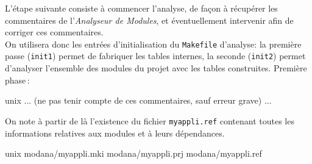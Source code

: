L'\'{e}tape suivante consiste \`{a} commencer l'analyse, de fa\c{c}on \`{a}
r\'{e}cup\'{e}rer les commentaires de l'{\em Analyseur de Modules}, et
\'{e}ventuellement intervenir afin de corriger ces commentaires.\\
On utilisera donc les entr\'{e}es d'initialisation du {\tt Makefile} d'analyse:
la premi\`{e}re passe ({\tt init1}) permet de fabriquer les tables
internes, la seconde 
({\tt init2}) permet d'analyser l'ensemble des modules du projet avec
les tables construites. Premi\`{e}re phase\,:
\begin{Longcode*}
unix%
 ...
 (ne pas tenir compte de ces commentaires, sauf erreur grave)
 ...
\end{Longcode*}
On note \`{a} partir de l\`{a} l'existence du fichier {\tt myappli.ref}
contenant toutes les informations relatives aux modules et \`{a} leurs
d\'{e}pendances. 
\begin{Longcode*}
unix%
modana/myappli.mki
modana/myappli.prj
modana/myappli.ref
\end{Longcode*}


